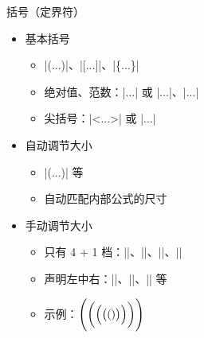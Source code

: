 \begin{frame}[fragile]{括号（定界符）}
  \begin{itemize}
    \item 基本括号
          \begin{itemize}
            \item |(...)|、|[...]|、|\{...\}|
            \item 绝对值、范数：|...| 或 |\vert...\vert|、|\Vert...\Vert|
            \item 尖括号：|<...>| 或 |\langle...\rangle|
          \end{itemize}
    \item 自动调节大小
          \begin{itemize}
            \item |\left(...\right)| 等
            \item 自动匹配内部公式的尺寸
          \end{itemize}
    \item 手动调节大小
          \begin{itemize}
            \item 只有 4 + 1 档：|\big|、|\Big|、|\bigg|、|\Bigg|
            \item 声明左中右：|\bigl|、|\bigm|、|\bigr| 等
            \item 示例：$\Biggl( \biggl( \Bigl( \bigl( () \bigr) \Bigr) \biggr) \Biggr)$
          \end{itemize}
  \end{itemize}

\end{frame}

